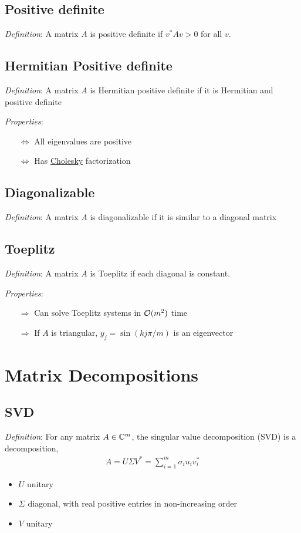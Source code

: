 \documentclass[12pt]{article}
\begin{document}
\subsection{Positive definite}
\textit{Definition}: A matrix \( A \) is positive definite if \( v^*Av > 0 \) for all \( v \).

\subsection{Hermitian Positive definite}
\textit{Definition}: A matrix \( A \) is Hermitian positive definite if it is Hermitian and positive definite 

\textit{Properties}:
\begin{itemize}[nolistsep]
    \item[\(\Leftrightarrow\)] All eigenvalues are positive
    \item[\(\Leftrightarrow\)] Has \hyperref[sec:cholesky]{Cholesky} factorization
\end{itemize}

\subsection{Diagonalizable}
\textit{Definition}: A matrix \( A \) is diagonalizable if it is similar to a diagonal matrix


\subsection{Toeplitz}
\textit{Definition}: A matrix \( A \) is Toeplitz if each diagonal is constant.

\textit{Properties}:
\begin{itemize}[nolistsep]
    \item[\(\Rightarrow\)] Can solve Toeplitz systems in \( \mathcal{O}(m^2) \) time
    \item[\(\Rightarrow\)] If \( A \) is triangular, \( y_j = \sin(k j \pi / m) \) is an eigenvector
\end{itemize}



\pagebreak
\section{Matrix Decompositions}

\subsection{SVD}
\textit{Definition}: For any matrix \( A\in\mathbb{C}^m \), the singular value decomposition (SVD) is a decomposition,
\begin{align*}
    A = U\Sigma V^* = \sum_{i=1}^{m} \sigma_i u_iv_i^*
\end{align*}
\begin{itemize}[nolistsep]
    \item \( U \) unitary
    \item \( \Sigma \) diagonal, with real positive entries in non-increasing order
    \item \( V \) unitary
\end{itemize}
\end{document}

